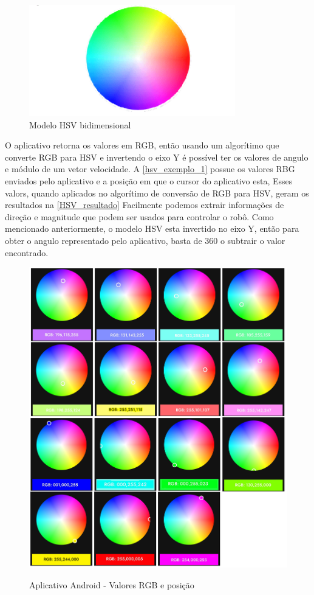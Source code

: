 \begin{figure}[ht]
	\centering
	\caption{Modelo HSV bidimensional}
	\includegraphics[width=0.8\textwidth]{figures/HSV}
\end{figure}


O aplicativo retorna os valores em RGB, então usando um algorítimo
que converte RGB para HSV e invertendo o eixo Y
é possível ter os valores de angulo e módulo de um vetor velocidade.
A \autoref{hsv_exemplo_1} possue os valores RBG enviados pelo aplicativo
e a posição em que o cursor do aplicativo esta,
Esses valors, quando aplicados no algorítimo de conversão de RGB para HSV, geram os resultados na \autoref{HSV_resultado}
Facilmente podemos extrair informações de direção e magnitude que podem ser usados para controlar o robô.
Como mencionado anteriormente, o modelo HSV esta invertido no eixo Y,
então para obter o angulo representado pelo aplicativo, basta de 360 o subtrair o valor encontrado.

\begin{figure}[ht]
	\centering
	\caption{Aplicativo Android - Valores RGB e posição}
	\includegraphics[width=1.0\textwidth]{figures/example_1_arduino_color}
	\label{hsv_exemplo_1}
\end{figure}


